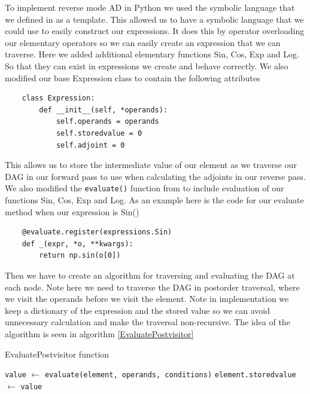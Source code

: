 \documentclass{article}
\begin{document}
To implement reverse mode AD in Python we used the symbolic language that we defined in \cite{PoPBook} as a template. This allowed us to have a symbolic language that we could use to easily construct our expressions. It does this by operator overloading our elementary operators so we can easily create an expression that we can traverse. Here we added additional elementary functions Sin, Cos, Exp and Log. So that they can exist in expressions we create and behave correctly. We also modified our base Expression class to contain the following attributes
\begin{verbatim}
    class Expression:
        def __init__(self, *operands):
            self.operands = operands
            self.storedvalue = 0
            self.adjoint = 0
\end{verbatim}
This allows us to store the intermediate value of our element as we traverse our DAG in our forward pass to use when calculating the adjoints in our reverse pass.
We also modified the \verb|evaluate()| function from \cite{PoPBook} to include evaluation of our functions Sin, Cos, Exp and Log. As an example here is the code for our evaluate method when our expression is Sin()
\begin{verbatim}
    @evaluate.register(expressions.Sin)
    def _(expr, *o, **kwargs):
        return np.sin(o[0])
\end{verbatim}

Then we have to create an algorithm for traversing and evaluating the DAG at each node. Note here we need to traverse the DAG in postorder traversal, where we visit the operands before we visit the element. Note in implementation we keep a dictionary of the expression and the stored value so we can avoid unnecessary calculation and make the traversal non-recursive. The idea of the algorithm is seen in algorithm \ref{EvaluatePostvisitor}

\begin{algorithm}[h!]
\caption{EvaluatePostvisitor function}\label{EvaluatePostvisitor}
\begin{algorithmic}[1]
\State \verb|value| $\gets$ \verb|evaluate(element, operands, conditions)|
\State \verb|element.storedvalue| $\gets$ \verb|value|
\EndFor
\EndProcedure
\end{algorithmic}
\end{algorithm}
\end{document}
